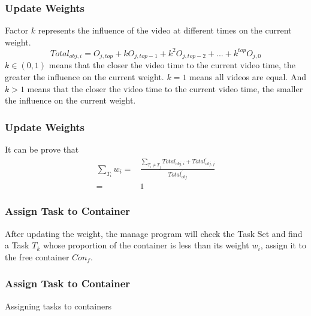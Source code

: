 \documentclass{beamer}
\begin{document}
\begin{frame}
    \frametitle{Update Weights} 
    Factor $k$ represents the influence of the video at different times on the current weight.
    $$Total_{obj,i}=O_{j,top}+kO_{j,top-1}+k^2O_{j,top-2}+...+k^{top}O_{j,0}$$ 
    $k\in (0,1)$ means that the closer the video time to the current video time, the greater the influence on the current weight. $k=1$ means all videos are equal. And $k>1$ means that the closer the video time to the current video time, the smaller the influence on the current weight.
\end{frame}

\begin{frame}
    \frametitle{Update Weights} 
    It can be prove that
    \begin{equation}
        \begin{split}
            \sum_{T_i}w_i=&\frac{\sum_{T_i\neq T_j}Total_{obj,i}+Total_{obj,j}^{'}}{Total_{obj}^{'}}\\
                =&1
        \end{split}
    \end{equation}
\end{frame}

\begin{frame}
    \frametitle{Assign Task to Container} 
    After updating the weight, the manage program will check the Task Set and find a Task $T_k$ whose proportion of the container is less than its weight $w_i$, assign it to the free container $Con_f$.
\end{frame}
\begin{frame}
    \frametitle{Assign Task to Container} 
    \begin{algorithm}[H]
        \SetAlgoLined
        \caption{Assigning tasks to containers}
    \end{algorithm}
\end{frame}
\end{document}
